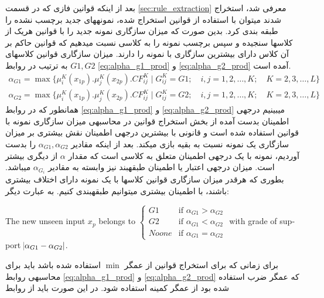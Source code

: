 \documentclass[10pt,a4paper]{article}
\newcommand{\نیمفاصله}{\halfspace}
\renewcommand{\ }{\halfspace}
\begin{document}
\زیرقسمت{استنتاج و طبقه\ بندی}
بعد از اینکه قوانین فازی که در قسمت
\ref{sec:rule_extraction}
 معرفی شد، استخراج شدند می\ توان با استفاده از قوانین استخراج شده، نمونه\ های جدید برچسب نشده را طبقه بندی کرد. بدین صورت که میزان سازگاری نمونه جدید را با قوانین هریک از کلاس\ ها سنجیده و سپس برچسب نمونه را به کلاسی نسبت می\ دهیم که قوانین حاکم بر آن کلاس دارای بیشترین سازگاری با نمونه را دارند. میزان سازگاری قوانین کلاس\ های
$G1, G2$
به ترتیب در روابط
\ref{eq:alpha_g1_prod} و \ref{eq:alpha_g2_prod}
آمده است.
\begin{eqnarray}
    \alpha_{G1} = \max\{\mu_i^K(x_{1p}) . \mu_j^K(x_{2p}) . CF_{ij}^K \mid G_{ij}^K = G1; \hspace{1em} i, j = 1, 2, \ldots , K;\hspace{1em}K = 2, 3, \ldots , L\}   \label{eq:alpha_g1_prod}\\
    \alpha_{G2} = \max\{\mu_i^K(x_{1p}) . \mu_j^K(x_{2p}) . CF_{ij}^K \mid G_{ij}^K = G2; \hspace{1em} i, j = 1, 2, \ldots , K;\hspace{1em}K = 2, 3, \ldots , L\}   \label{eq:alpha_g2_prod}
\end{eqnarray}
همان\ طور که در روابط
\ref{eq:alpha_g1_prod} و \ref{eq:alpha_g2_prod}
می\ بینیم درجه\ ی اطمینان بدست آمده از بخش استخراج قوانین در محاسبه\ ی میزان سازگاری نمونه با قوانین استفاده شده است و قانونی با بیشترین درجه\ ی اطمینان نقش بیشتری بر میزان سازگاری یک نمونه نسبت به بقیه بازی می\ کند.
بعد از اینکه مقادیر
$\alpha_{G1}, \alpha_{G2}$
را بدست آوردیم، نمونه با یک درجه\ ی اطمینان متعلق به کلاسی است که مقدار
$\alpha$
از دیگری بیشتر است. میزان درجه\ ی اعتبار یا اطمینان طبقه\ بند نیز وابسته به مقادیر
$\alpha_{G_i}$
می\ باشد. بطوری که هرقدر میزان سازگاری قوانین کلاس\ ها با یک نمونه دارای اختلاف بیشتری باشند، با اطمینان بیشتری می\ توانیم طبقه\ بندی کنیم. به عبارت دیگر:
\begin{latin}\small
The new unseen input $x_p$ belongs to $
\begin{cases}
G1 & \text{if }\alpha_{G1} > \alpha_{G2} \\
G2 & \text{if }\alpha_{G1} < \alpha_{G2} \\
Noone & \text{if }\alpha_{G1} = \alpha_{G2}
\end{cases}$
\hspace{1em}with grade of support $\abs{\alpha_{G1} - \alpha_{G2}}$.
\end{latin}
برای زمانی که برای استخراج قوانین از عمگر
$\min$
استفاده شده باشد باید برای محاسبه\ ی روابط
\ref{eq:alpha_g1_prod} و \ref{eq:alpha_g2_prod}
که عمگر ضرب استفاده شده بود از عمگر کمینه استفاده شود. در این صورت باید از روابط
\end{document}
